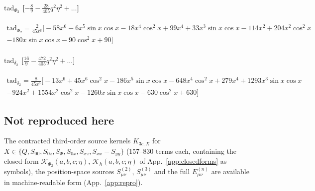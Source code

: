\paragraph{$\mathrm{tad}_{\Phi_2}$ [$-\tfrac89-\tfrac{28}{405}q^2\eta^2+\ldots$]}
\begin{multline*}
\mathrm{tad}_{\Phi_2}=\frac{2}{45 x^{6}}\Big[- 58 x^{6}- 6 x^{5} \sin x \cos x- 18 x^{4} \cos^2x+99 x^{4}+33 x^{3} \sin x \cos x- 114 x^{2}+204 x^{2} \cos^2x\\
- 180 x \sin x \cos x- 90 \cos^2x+90\Big]
\end{multline*}

\paragraph{$\mathrm{tad}_{\delta_2}$ [$\tfrac{16}9-\tfrac{472}{405}q^2\eta^2+\ldots$]}
\begin{multline*}
\mathrm{tad}_{\delta_2}=\frac{8}{45 x^{6}}\Big[- 13 x^{6}+45 x^{6} \cos^2x- 186 x^{5} \sin x \cos x- 648 x^{4} \cos^2x+279 x^{4}+1293 x^{3} \sin x \cos x\\
- 924 x^{2}+1554 x^{2} \cos^2x- 1260 x \sin x \cos x- 630 \cos^2x+630\Big]
\end{multline*}


\subsection{Not reproduced here}
The contracted third-order source kernels $K_{3c,X}$ for $X\in\{Q,S_{00},S_{0z},S_\Phi,S_{0x},S_{xz},S_{xx}-S_{yy}\}$
(157--830 terms each, containing the closed-form $\mathcal K_{\Phi_2}(a,b,c;\eta)$, $\mathcal K_h(a,b,c;\eta)$ of App.~\ref{app:closedforms} as symbols),
the position-space sources $S^{(2)}_{\mu\nu}$, $S^{(3)}_{\mu\nu}$ and the full $E^{(n)}_{\mu\nu}$ are available in machine-readable form
(App.~\ref{app:repro}).
